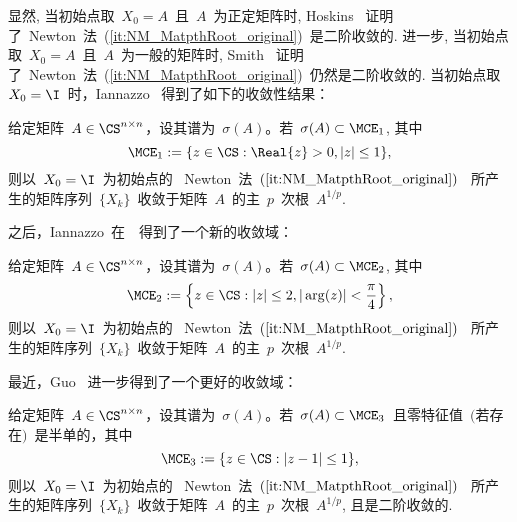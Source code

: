 显然, 当初始点取~$X_0 = A$~且~$A$~为正定矩阵时,
Hoskins~\cite{Hoskins1979}
证明了~Newton~法~(\ref{it:NM_MatpthRoot_original})~是二阶收敛的.
进一步, 当初始点取~$X_0 = A$~且~$A$~为一般的矩阵时,
Smith~\cite{Smith2003}
证明了~Newton~法~(\ref{it:NM_MatpthRoot_original})~仍然是二阶收敛的.
当初始点取~$X_0 = \I$~时，Iannazzo
\cite{Iannazzo2006}~得到了如下的收敛性结果：

\begin{theorem}
\label{th:Conv_NM_Ian2006} 给定矩阵~$A\in\CS^{n\times
n}$，设其谱为~$\sigma(A)$。若~$\sigma(A) \subset \MCE_1$, 其中
\begin{equation}
\label{set:ConvReg_NM_Ian2006} \MCE_1 := \{z\in\CS: \Real{z}
>0, |z| \leq 1\},
\end{equation}
则以~$X_0 = \I$~为初始点的
~Newton~法~$(\ref{it:NM_MatpthRoot_original})$~
所产生的矩阵序列~$\{X_k\}$~收敛于矩阵~$A$~的主~$p$~次根~$A^{1/p}$.
\end{theorem}

之后，Iannazzo~在~\cite{Iannazzo2008}~得到了一个新的收敛域：

\begin{theorem}
\label{th:Conv_NM_Ian2006} 给定矩阵~$A\in\CS^{n\times
n}$，设其谱为~$\sigma(A)$。若~$\sigma(A) \subset \MCE_2$, 其中
\begin{equation}
\label{set:ConvReg_NM_Ian08} \MCE_2 := \left\{z\in\CS: |z|\leq 2,
|\arg(z)|< \frac{\pi}{4}\right\},
\end{equation}
则以~$X_0 = \I$~为初始点的
~Newton~法~$(\ref{it:NM_MatpthRoot_original})$~
所产生的矩阵序列~$\{X_k\}$~收敛于矩阵~$A$~的主~$p$~次根~$A^{1/p}$.
\end{theorem}

最近，Guo \cite{Guo2010}~进一步得到了一个更好的收敛域：

\begin{theorem}
\label{th:Conv_NM_Guo2010} 给定矩阵~$A\in\CS^{n\times
n}$，设其谱为~$\sigma(A)$。若~$\sigma(A) \subset
\MCE_3$~且零特征值~$($若存在$)$~是半单的，其中
\begin{equation}
\label{set:ConvReg_NM_Guo2010} \MCE_3 := \{z\in\CS: |z-1| \leq 1\},
\end{equation}
则以~$X_0 = \I$~为初始点的
~Newton~法~$(\ref{it:NM_MatpthRoot_original})$~
所产生的矩阵序列~$\{X_k\}$~收敛于矩阵~$A$~的主~$p$~次根~$A^{1/p}$,
且是二阶收敛的.
\end{theorem}


